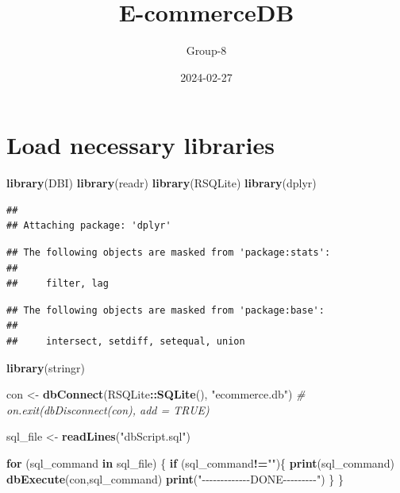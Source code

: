 \documentclass[
]{article}
\title{E-commerceDB}
\author{Group-8}
\date{2024-02-27}
\newenvironment{Shaded}{\begin{snugshade}}{\end{snugshade}}
\newcommand{\CommentTok}[1]{\textcolor[rgb]{0.56,0.35,0.01}{\textit{#1}}}
\newcommand{\ControlFlowTok}[1]{\textcolor[rgb]{0.13,0.29,0.53}{\textbf{#1}}}
\newcommand{\FunctionTok}[1]{\textcolor[rgb]{0.13,0.29,0.53}{\textbf{#1}}}
\newcommand{\NormalTok}[1]{#1}
\newcommand{\OtherTok}[1]{\textcolor[rgb]{0.56,0.35,0.01}{#1}}
\newcommand{\SpecialCharTok}[1]{\textcolor[rgb]{0.81,0.36,0.00}{\textbf{#1}}}
\newcommand{\StringTok}[1]{\textcolor[rgb]{0.31,0.60,0.02}{#1}}
\begin{document}
\maketitle

\hypertarget{load-necessary-libraries}{%
\section{Load necessary libraries}\label{load-necessary-libraries}}

\begin{Shaded}
\begin{Highlighting}[]
\FunctionTok{library}\NormalTok{(DBI)}
\FunctionTok{library}\NormalTok{(readr)}
\FunctionTok{library}\NormalTok{(RSQLite)}
\FunctionTok{library}\NormalTok{(dplyr)}
\end{Highlighting}
\end{Shaded}

\begin{verbatim}
## 
## Attaching package: 'dplyr'
\end{verbatim}

\begin{verbatim}
## The following objects are masked from 'package:stats':
## 
##     filter, lag
\end{verbatim}

\begin{verbatim}
## The following objects are masked from 'package:base':
## 
##     intersect, setdiff, setequal, union
\end{verbatim}

\begin{Shaded}
\begin{Highlighting}[]
\FunctionTok{library}\NormalTok{(stringr)}
\end{Highlighting}
\end{Shaded}

\begin{Shaded}
\begin{Highlighting}[]
\NormalTok{con }\OtherTok{\textless{}{-}} \FunctionTok{dbConnect}\NormalTok{(RSQLite}\SpecialCharTok{::}\FunctionTok{SQLite}\NormalTok{(), }\StringTok{"ecommerce.db"}\NormalTok{)}
\CommentTok{\# on.exit(dbDisconnect(con), add = TRUE)}

\NormalTok{sql\_file }\OtherTok{\textless{}{-}} \FunctionTok{readLines}\NormalTok{(}\StringTok{"dbScript.sql"}\NormalTok{)}

\ControlFlowTok{for}\NormalTok{ (sql\_command }\ControlFlowTok{in}\NormalTok{ sql\_file) \{}
  \ControlFlowTok{if}\NormalTok{ (sql\_command}\SpecialCharTok{!=}\StringTok{""}\NormalTok{)\{}
    \FunctionTok{print}\NormalTok{(sql\_command)}
    \FunctionTok{dbExecute}\NormalTok{(con,sql\_command)}
    \FunctionTok{print}\NormalTok{(}\StringTok{"{-}{-}{-}{-}{-}{-}{-}{-}{-}{-}{-}{-}{-}DONE{-}{-}{-}{-}{-}{-}{-}{-}{-}"}\NormalTok{)}
\NormalTok{  \}}
\NormalTok{\}}
\end{Highlighting}
\end{Shaded}
\end{document}

